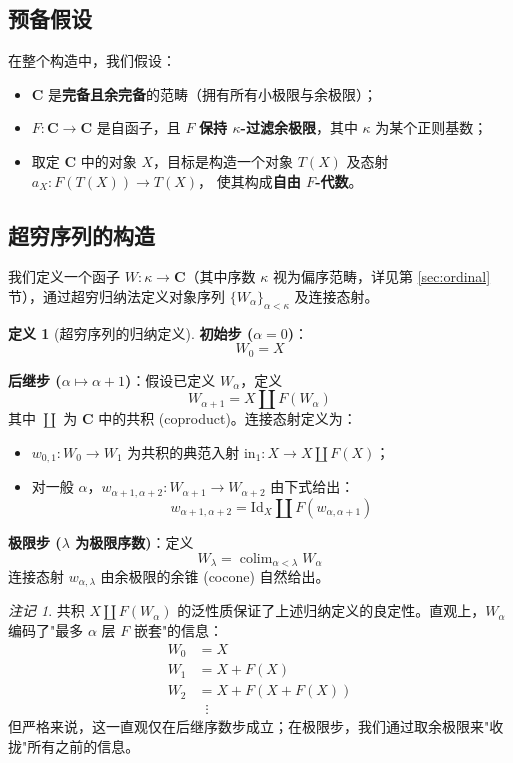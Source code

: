 \documentclass[UTF8,a4paper,12pt]{ctexart}
\theoremstyle{definition}
\newtheorem{definition}{定义}[section]
\theoremstyle{plain}
\theoremstyle{remark}
\newtheorem{remark}{注记}[section]
\newcommand{\cat}[1]{\mathbf{#1}}
\newcommand{\Id}{\mathrm{Id}}
\newcommand{\colim}{\operatorname{colim}}
\begin{document}
\subsection{预备假设}

在整个构造中，我们假设：
\begin{itemize}
    \item $\cat{C}$ 是\textbf{完备且余完备}的范畴（拥有所有小极限与余极限）；
    \item $F: \cat{C} \to \cat{C}$ 是自函子，且 $F$ \textbf{保持 $\kappa$-过滤余极限}，其中 $\kappa$ 为某个正则基数；
    \item 取定 $\cat{C}$ 中的对象 $X$，目标是构造一个对象 $T(X)$ 及态射 $a_X: F(T(X)) \to T(X)$，
          使其构成\textbf{自由 $F$-代数}。
\end{itemize}

\subsection{超穷序列的构造}

我们定义一个函子 $W: \kappa \to \cat{C}$（其中序数 $\kappa$ 视为偏序范畴，详见第 \ref{sec:ordinal} 节），通过超穷归纳法定义对象序列 $\{W_\alpha\}_{\alpha < \kappa}$ 及连接态射。

\begin{definition}[超穷序列的归纳定义]\label{def:transfinite}
\textbf{初始步 ($\alpha = 0$)}：
\[
W_0 = X
\]

\textbf{后继步 ($\alpha \mapsto \alpha+1$)}：假设已定义 $W_\alpha$，定义
\[
W_{\alpha+1} = X \coprod F(W_\alpha)
\]
其中 $\coprod$ 为 $\cat{C}$ 中的共积 (coproduct)。连接态射定义为：
\begin{itemize}
    \item $w_{0,1}: W_0 \to W_1$ 为共积的典范入射 $\mathrm{in}_1: X \to X \coprod F(X)$；
    \item 对一般 $\alpha$，$w_{\alpha+1, \alpha+2}: W_{\alpha+1} \to W_{\alpha+2}$ 由下式给出：
    \[
    w_{\alpha+1, \alpha+2} = \Id_X \coprod F(w_{\alpha, \alpha+1})
    \]
\end{itemize}

\textbf{极限步 ($\lambda$ 为极限序数)}：定义
\[
W_\lambda = \colim_{\alpha < \lambda} W_\alpha
\]
连接态射 $w_{\alpha, \lambda}$ 由余极限的余锥 (cocone) 自然给出。
\end{definition}

\begin{remark}
共积 $X \coprod F(W_\alpha)$ 的泛性质保证了上述归纳定义的良定性。直观上，$W_\alpha$ 编码了"最多 $\alpha$ 层 $F$ 嵌套"的信息：
\begin{align*}
W_0 &= X \\
W_1 &= X + F(X) \\
W_2 &= X + F(X + F(X)) \\
&\;\;\vdots
\end{align*}
但严格来说，这一直观仅在后继序数步成立；在极限步，我们通过取余极限来"收拢"所有之前的信息。
\end{remark}
\end{document}

